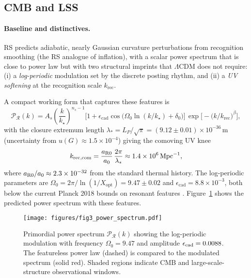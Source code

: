 \documentclass[11pt]{article}
\theoremstyle{definition}
\theoremstyle{remark}
\begin{document}
\subsection{CMB and LSS}

\paragraph{Baseline and distinctives.}
RS predicts adiabatic, nearly Gaussian curvature perturbations from recognition smoothing (the RS analogue of inflation), with a scalar power spectrum that is close to power law but with two structural imprints that \(\Lambda\)CDM does not require:
(i) a \emph{log-periodic} modulation set by the discrete posting rhythm, and
(ii) a \emph{UV softening} at the recognition scale \(k_{\mathrm{rec}}\).

A compact working form that captures these features is
\begin{equation}
\label{eq:Pr_RS}
\mathcal P_{\mathcal R}(k)
= A_s\left(\frac{k}{k_\star}\right)^{n_s-1}
\Big[1+\epsilon_{\mathrm{cad}}\cos\!\big(\Omega_0\ln(k/k_\star)+\delta_0\big)\Big]\,
\exp\!\Big[-\big(k/k_{\mathrm{rec}}\big)^{\beta}\Big],
\end{equation}
with the closure extremum length \(\lambda_{\ast} = L_P/\sqrt{\pi} = (9.12 \pm 0.01)\times10^{-36}\,\mathrm{m}\) (uncertainty from \(u(G) \approx 1.5\times10^{-4}\)) giving the comoving UV knee
\[
k_{\mathrm{rec,com}} = \frac{a_{\rm R0}}{a_0}\,\frac{2\pi}{\lambda_{\ast}} \approx 1.4\times10^{6}\,\mathrm{Mpc}^{-1},
\]
where \(a_{\rm R0}/a_0 \approx 2.3\times10^{-32}\) from the standard thermal history. The log-periodic parameters are \(\Omega_0 = 2\pi/\ln(1/X_{\mathrm{opt}}) = 9.47 \pm 0.02\) and \(\epsilon_{\mathrm{cad}} = 8.8\times10^{-3}\), both below the current Planck 2018 bounds on resonant features \citep{Planck2018resonant}. Figure~\ref{fig:pps} shows the predicted power spectrum with these features.

\begin{figure}[htbp]
\centering
\texttt{[image: figures/fig3\_power\_spectrum.pdf]}
\caption{Primordial power spectrum \(\mathcal{P}_{\mathcal{R}}(k)\) showing the log-periodic modulation with frequency \(\Omega_0 = 9.47\) and amplitude \(\epsilon_{\rm cad} = 0.0088\). The featureless power law (dashed) is compared to the modulated spectrum (solid red). Shaded regions indicate CMB and large-scale-structure observational windows.}
\label{fig:pps}
\end{figure}
\end{document}
